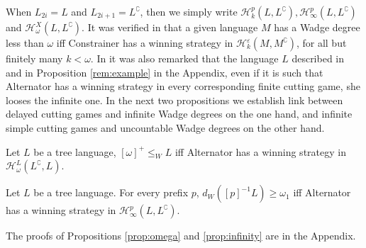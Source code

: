 When $L_{2i}=L$ and $L_{2i+1}=L^\complement$, then we simply write $\mathcal{H}^p_k(L, L^\complement), \mathcal{H}^p_\infty(L, L^\complement)$ and  $\mathcal{H}^{X}_\omega(L, L^\complement)$.
It was verified in \cite{bp} that a given language $M$ has a Wadge degree less than $\omega$ iff Constrainer has a winning strategy in $\mathcal{H}^\varepsilon_k(M, M^\complement)$, for all but finitely many $k<\omega$.
In \cite{bp} it was also remarked that the language $L$ described in \cite[Section 4.1]{bp} and in Proposition \ref{rem:example} in the Appendix, even  if it is such that Alternator has a winning strategy in every corresponding finite cutting game, she looses the infinite one.
In the next two propositions we establish link between delayed cutting games and infinite Wadge degrees on the one hand, and infinite simple cutting games and uncountable Wadge degrees on the other hand.
\begin{proposition}\label{prop:omega} Let $L$ be a tree language, $[\omega]^+ \leq_W L$ iff Alternator has a winning strategy in $\mathcal{H}^{L}_\omega(L^\complement, L)$. 
\end{proposition}
\begin{proposition}\label{prop:infinity} Let $L$ be a tree language. For every prefix $p$,
$d_W([p]^{-1}L) \geq \omega_1$ iff Alternator has a winning strategy in $\mathcal{H}^p_\infty(L, L^\complement)$. 
\end{proposition}
The proofs of Propositions \ref{prop:omega} and \ref{prop:infinity} are in the Appendix. 

